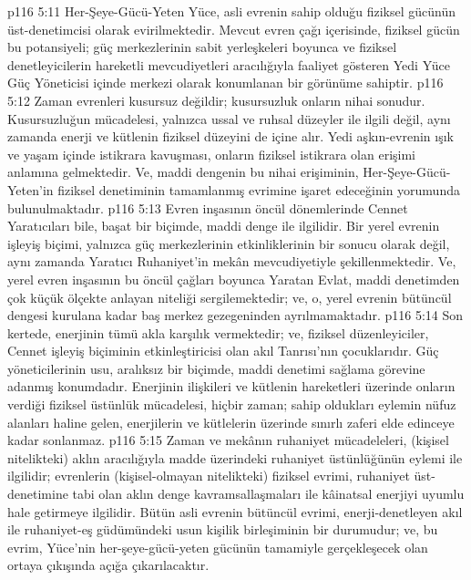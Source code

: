 \vs p116 5:11 Her\hyp{}Şeye\hyp{}Gücü\hyp{}Yeten Yüce, asli evrenin sahip olduğu fiziksel gücünün üst\hyp{}denetimcisi olarak evirilmektedir. Mevcut evren çağı içerisinde, fiziksel gücün bu potansiyeli; güç merkezlerinin sabit yerleşkeleri boyunca ve fiziksel denetleyicilerin hareketli mevcudiyetleri aracılığıyla faaliyet gösteren Yedi Yüce Güç Yöneticisi içinde merkezi olarak konumlanan bir görünüme sahiptir.
\vs p116 5:12 Zaman evrenleri kusursuz değildir; kusursuzluk onların nihai sonudur. Kusursuzluğun mücadelesi, yalnızca ussal ve ruhsal düzeyler ile ilgili değil, aynı zamanda enerji ve kütlenin fiziksel düzeyini de içine alır. Yedi aşkın\hyp{}evrenin ışık ve yaşam içinde istikrara kavuşması, onların fiziksel istikrara olan erişimi anlamına gelmektedir. Ve, maddi dengenin bu nihai erişiminin, Her\hyp{}Şeye\hyp{}Gücü\hyp{}Yeten’in fiziksel denetiminin tamamlanmış evrimine işaret edeceğinin yorumunda bulunulmaktadır.
\vs p116 5:13 Evren inşasının öncül dönemlerinde Cennet Yaratıcıları bile, başat bir biçimde, maddi denge ile ilgilidir. Bir yerel evrenin işleyiş biçimi, yalnızca güç merkezlerinin etkinliklerinin bir sonucu olarak değil, aynı zamanda Yaratıcı Ruhaniyet’in mekân mevcudiyetiyle şekillenmektedir. Ve, yerel evren inşasının bu öncül çağları boyunca Yaratan Evlat, maddi denetimden çok küçük ölçekte anlayan niteliği sergilemektedir; ve, o, yerel evrenin bütüncül dengesi kurulana kadar baş merkez gezegeninden ayrılmamaktadır.
\vs p116 5:14 Son kertede, enerjinin tümü akla karşılık vermektedir; ve, fiziksel düzenleyiciler, Cennet işleyiş biçiminin etkinleştiricisi olan akıl Tanrısı’nın çocuklarıdır. Güç yöneticilerinin usu, aralıksız bir biçimde, maddi denetimi sağlama görevine adanmış konumdadır. Enerjinin ilişkileri ve kütlenin hareketleri üzerinde onların verdiği fiziksel üstünlük mücadelesi, hiçbir zaman; sahip oldukları eylemin nüfuz alanları haline gelen, enerjilerin ve kütlelerin üzerinde sınırlı zaferi elde edinceye kadar sonlanmaz.
\vs p116 5:15 Zaman ve mekânın ruhaniyet mücadeleleri, (kişisel nitelikteki) aklın aracılığıyla madde üzerindeki ruhaniyet üstünlüğünün eylemi ile ilgilidir; evrenlerin (kişisel\hyp{}olmayan nitelikteki) fiziksel evrimi, ruhaniyet üst\hyp{}denetimine tabi olan aklın denge kavramsallaşmaları ile kâinatsal enerjiyi uyumlu hale getirmeye ilgilidir. Bütün asli evrenin bütüncül evrimi, enerji\hyp{}denetleyen akıl ile ruhaniyet\hyp{}eş güdümündeki usun kişilik birleşiminin bir durumudur; ve, bu evrim, Yüce’nin her\hyp{}şeye\hyp{}gücü\hyp{}yeten gücünün tamamiyle gerçekleşecek olan ortaya çıkışında açığa çıkarılacaktır.
